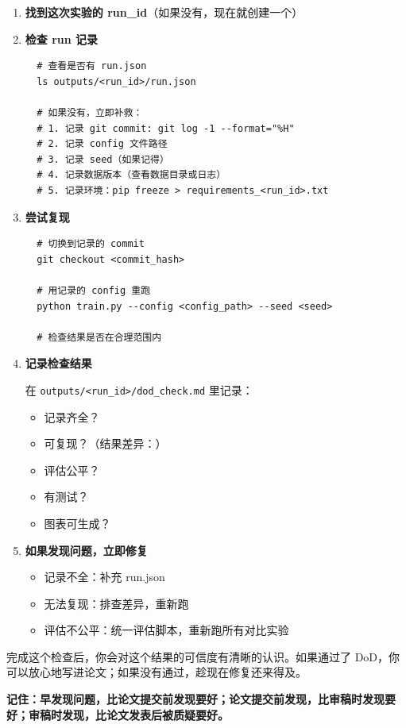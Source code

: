 \begin{enumerate}
  \item \textbf{找到这次实验的 run\_id}（如果没有，现在就创建一个）

  \item \textbf{检查 run 记录}
  \begin{verbatim}
  # 查看是否有 run.json
  ls outputs/<run_id>/run.json

  # 如果没有，立即补救：
  # 1. 记录 git commit: git log -1 --format="%H"
  # 2. 记录 config 文件路径
  # 3. 记录 seed（如果记得）
  # 4. 记录数据版本（查看数据目录或日志）
  # 5. 记录环境：pip freeze > requirements_<run_id>.txt
  \end{verbatim}

  \item \textbf{尝试复现}
  \begin{verbatim}
  # 切换到记录的 commit
  git checkout <commit_hash>

  # 用记录的 config 重跑
  python train.py --config <config_path> --seed <seed>

  # 检查结果是否在合理范围内
  \end{verbatim}

  \item \textbf{记录检查结果}

  在 \texttt{outputs/<run\_id>/dod\_check.md} 里记录：
  \begin{itemize}
    \item[$\square$] 记录齐全？
    \item[$\square$] 可复现？（结果差异：\underline{\hspace{2cm}}）
    \item[$\square$] 评估公平？
    \item[$\square$] 有测试？
    \item[$\square$] 图表可生成？
  \end{itemize}

  \item \textbf{如果发现问题，立即修复}
  \begin{itemize}
    \item 记录不全：补充 run.json
    \item 无法复现：排查差异，重新跑
    \item 评估不公平：统一评估脚本，重新跑所有对比实验
  \end{itemize}
\end{enumerate}

完成这个检查后，你会对这个结果的可信度有清晰的认识。如果通过了 DoD，你可以放心地写进论文；如果没有通过，趁现在修复还来得及。

\textbf{记住：早发现问题，比论文提交前发现要好；论文提交前发现，比审稿时发现要好；审稿时发现，比论文发表后被质疑要好。}
